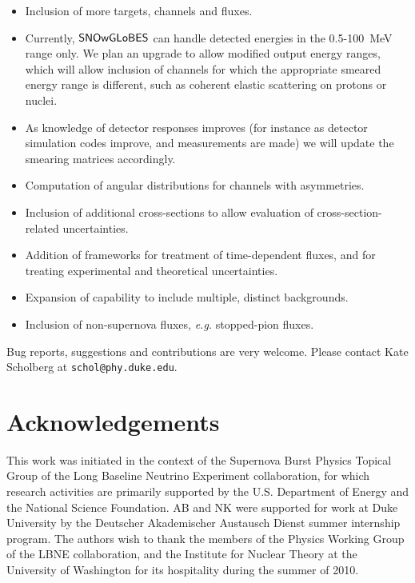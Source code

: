 \documentclass[12pt]{article}
\newcommand{\snowglobes}{\sf{SNOwGLoBES}}
\begin{document}
\begin{itemize}

\item Inclusion of more targets, channels and fluxes.

\item Currently, $\snowglobes$ can handle detected energies in the
  0.5-100~MeV range only.  We plan an upgrade to allow modified output
  energy ranges, which will allow inclusion of channels for which
  the appropriate smeared energy range is different, such as coherent elastic
  scattering on protons or nuclei.

\item As knowledge of detector responses improves (for instance as
  detector simulation codes improve, and measurements are made) we
  will update the smearing matrices accordingly.

\item Computation of angular distributions for channels with asymmetries.

\item Inclusion of additional cross-sections to allow evaluation of cross-section-related uncertainties.

\item Addition of frameworks for treatment of time-dependent fluxes, and for treating experimental and theoretical uncertainties.

\item Expansion of capability to include multiple, distinct backgrounds.


\item Inclusion of
   non-supernova fluxes, \textit{e.g.} stopped-pion fluxes.

\end{itemize}

Bug reports, suggestions and contributions are very welcome.  Please
contact Kate Scholberg at \texttt{schol@phy.duke.edu}.


\section{Acknowledgements}

This work was initiated in the context of the Supernova Burst Physics
Topical Group of the Long Baseline Neutrino Experiment collaboration,
for which research activities are primarily supported by the
U.S. Department of Energy and the National Science Foundation.  AB and
NK were supported for work at Duke University by the Deutscher
Akademischer Austausch Dienst summer internship program.  The authors
wish to thank the members of the Physics Working Group of the LBNE
collaboration, and the Institute for Nuclear Theory at the
University of Washington for its
hospitality during the summer of 2010.
\end{document}
